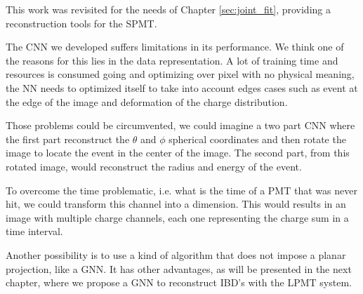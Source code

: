 \documentclass[../main.tex]{subfiles}
\begin{document}
This work was revisited for the needs of Chapter \ref{sec:joint_fit}, providing a reconstruction tools for the SPMT.

The CNN we developed suffers limitations in its performance. We think one of the  reasons for this lies in  the data representation. A lot of training time and resources is consumed going and optimizing over pixel with no physical meaning, the NN needs to optimized itself to take into account edges cases such as event at the edge of the image and deformation of the charge distribution.

Those problems could be circumvented, we could imagine a two part CNN where the first part reconstruct the $\theta$ and $\phi$ spherical coordinates and then rotate the image to locate the event in the center of the image. The second part, from this rotated image, would reconstruct the radius and energy of the event.

To overcome the time problematic, i.e. what is the time of a PMT that was never hit, we could transform this channel into a dimension. This would results in an image with multiple charge channels, each one representing the charge sum in a time interval.

Another possibility is to use  a kind of algorithm that does not impose a planar projection, like a GNN. It has other advantages, as will be presented in the next chapter, where we propose a GNN to reconstruct IBD's with the LPMT system.
\end{document}
